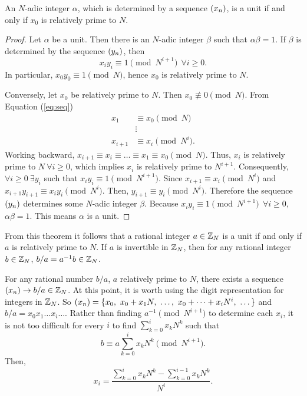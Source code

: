 \begin{theorem}\label{thm:units}
  An $N$-adic integer $\alpha$, which is determined by a sequence $(x_n)$, is
  a unit if and only if $x_0$ is relatively prime to $N$.
\end{theorem}
\begin{proof}
  Let $\alpha$ be a unit. Then there is an $N$-adic integer $\beta$ such
  that $\alpha\beta=1$. If $\beta$ is determined by the sequence $(y_n)$, then
  \begin{equation}\label{eq:units}
    x_iy_i\equiv1\pmod{N^{i+1}} \ \ \forall i \geq 0.
  \end{equation}
  In particular, $x_0y_0\equiv1\pmod N$, hence $x_0$ is relatively prime to
  $N$. 
  \par Conversely, let $x_0$ be relatively prime to $N$. Then
  $x_0\not\equiv0\pmod{N}$. From Equation (\ref{eq:seq})
  \begin{align*}
    x_1 &\equiv x_0 \pmod N\\
    &\vdots \\
    x_{i+1} &\equiv x_i \pmod{N^i}. 
  \end{align*}
  Working backward, $x_{i+1} \equiv x_i \equiv \dots \equiv x_1 \equiv
  x_0 \pmod N$. Thus, $x_i$ is relatively prime to $N \ \forall i\geq0$,
  which implies $x_i$ is relatively prime to $N^{i+1}$. Consequently,
  $\forall i\geq0 \ \exists y_i$ such that $x_iy_i \equiv 1 \pmod{N^{i+1}}$.
  Since $x_{i+1} \equiv x_i \pmod N^i$ and $x_{i+1}y_{i+1} \equiv
  x_iy_i \pmod{N^i}$. Then, $y_{i+1} \equiv y_i \pmod{N^i}$. Therefore the
  sequence $(y_n)$ determines some $N$-adic integer $\beta$. Because
  $x_iy_i \equiv 1 \pmod{N^{i+1}} \ \ \forall i \geq 0$, $\alpha\beta=1$.
  This means $\alpha$ is a unit.
\end{proof}

\par From this theorem it follows that a rational integer $a\in\mathbb{Z}_N$ is a
unit if and only if $a$ is relatively prime to $N$. If $a$ is invertible in
$\mathbb{Z}_N$, then for any rational integer $b\in\mathbb{Z}_N$, $b/a=a^{-1}b\in\mathbb{Z}_N$.

\par For any rational number $b/a$, $a$ relatively prime to $N$, there
exists a sequence $(x_n) \rightarrow b/a \in \mathbb{Z}_N$. At this point, it is
worth using the digit representation for integers in $\mathbb{Z}_N$. So
$\xn=\{x_0, \ x_0+x_1N, \ \dots, \ x_0+\dots+x_iN^i, \ \dots\}$ and
$b/a = x_0x_1\dots x_i\dots$. Rather than finding $a^{-1}\pmod{N^{i+1}}$ to
determine each $x_i$, it is not too difficult for every $i$ to find
$\sum_{k=0}^ix_kN^k$ such that
\begin{equation}\label{eq:seq-rational}
  b \equiv a\sum_{k=0}^ix_kN^k \pmod{N^{i+1}}.
\end{equation}
Then, 
\begin{equation}
  x_i = \frac{\sum_{k=0}^ix_kN^k - \sum_{k=0}^{i-1}x_kN^k}{N^i}.
\end{equation}


